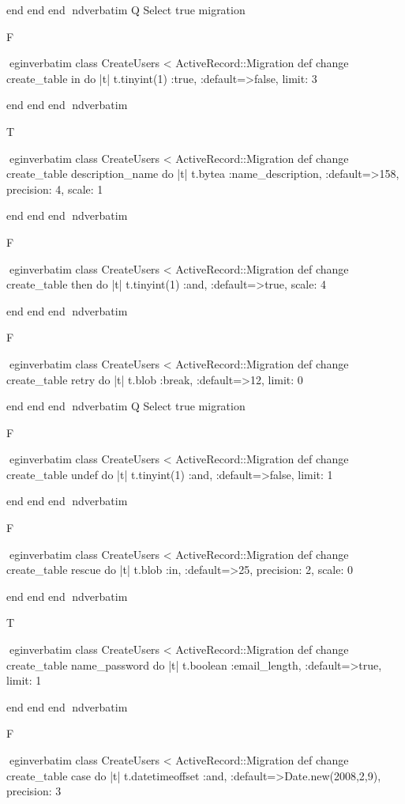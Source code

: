     end 
  end 
end
nd{verbatim}
Q
 Select true migration

F

egin{verbatim}
 class CreateUsers < ActiveRecord::Migration 
  def change 
    create_table in do |t| 
      t.tinyint(1) :true, :default=>false, limit: 3
    
    end 
  end 
end
nd{verbatim}

T

egin{verbatim}
 class CreateUsers < ActiveRecord::Migration 
  def change 
    create_table description_name do |t| 
      t.bytea :name_description, :default=>158, precision: 4, scale: 1
    
    end 
  end 
end
nd{verbatim}

F

egin{verbatim}
 class CreateUsers < ActiveRecord::Migration 
  def change 
    create_table then do |t| 
      t.tinyint(1) :and, :default=>true, scale: 4
    
    end 
  end 
end
nd{verbatim}

F

egin{verbatim}
 class CreateUsers < ActiveRecord::Migration 
  def change 
    create_table retry do |t| 
      t.blob :break, :default=>12, limit: 0
    
    end 
  end 
end
nd{verbatim}
Q
 Select true migration

F

egin{verbatim}
 class CreateUsers < ActiveRecord::Migration 
  def change 
    create_table undef do |t| 
      t.tinyint(1) :and, :default=>false, limit: 1
    
    end 
  end 
end
nd{verbatim}

F

egin{verbatim}
 class CreateUsers < ActiveRecord::Migration 
  def change 
    create_table rescue do |t| 
      t.blob :in, :default=>25, precision: 2, scale: 0
    
    end 
  end 
end
nd{verbatim}

T

egin{verbatim}
 class CreateUsers < ActiveRecord::Migration 
  def change 
    create_table name_password do |t| 
      t.boolean :email_length, :default=>true, limit: 1
    
    end 
  end 
end
nd{verbatim}

F

egin{verbatim}
 class CreateUsers < ActiveRecord::Migration 
  def change 
    create_table case do |t| 
      t.datetimeoffset :and, :default=>Date.new(2008,2,9), precision: 3
    
